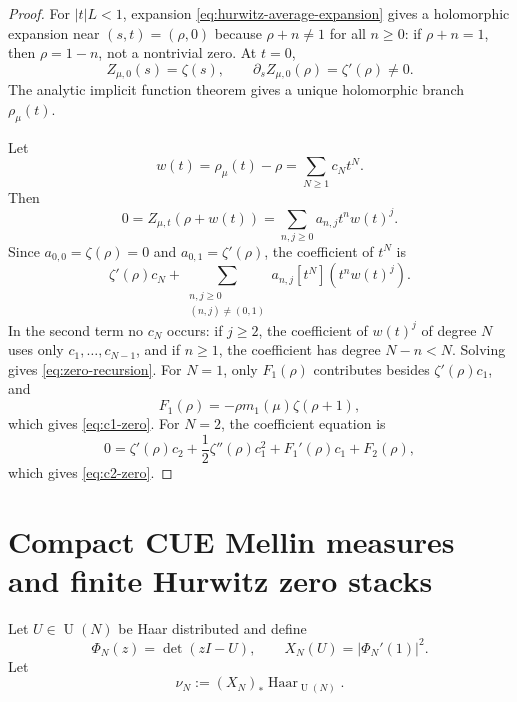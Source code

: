 \documentclass[11pt]{article}
\newcommand{\Haar}{\operatorname{Haar}}
\newcommand{\U}{\operatorname{U}}
\newcommand{\1}{\mathbf 1}
\numberwithin{equation}{section}
\begin{document}
\begin{proof}
For $|t|L<1$, expansion \eqref{eq:hurwitz-average-expansion} gives a holomorphic expansion near $(s,t)=(\rho,0)$ because $\rho+n\ne1$ for all $n\ge0$: if $\rho+n=1$, then $\rho=1-n$, not a nontrivial zero.  At $t=0$,
\begin{equation}
  Z_{\mu,0}(s)=\zeta(s),
  \qquad
  \partial_s Z_{\mu,0}(\rho)=\zeta'(\rho)\ne0.
\end{equation}
The analytic implicit function theorem gives a unique holomorphic branch $\rho_\mu(t)$.

Let
\begin{equation}
  w(t)=\rho_\mu(t)-\rho=\sum_{N\ge1}c_Nt^N.
\end{equation}
Then
\begin{equation}
  0=Z_{\mu,t}(\rho+w(t))=
  \sum_{n,j\ge0}a_{n,j}t^n w(t)^j.
\end{equation}
Since $a_{0,0}=\zeta(\rho)=0$ and $a_{0,1}=\zeta'(\rho)$, the coefficient of $t^N$ is
\begin{equation}
  \zeta'(\rho)c_N+
  \sum_{\substack{n,j\ge0\\(n,j)\ne(0,1)}}
  a_{n,j}[t^N](t^nw(t)^j).
\end{equation}
In the second term no $c_N$ occurs: if $j\ge2$, the coefficient of $w(t)^j$ of degree $N$ uses only $c_1,\dots,c_{N-1}$, and if $n\ge1$, the coefficient has degree $N-n<N$.  Solving gives \eqref{eq:zero-recursion}.  For $N=1$, only $F_1(\rho)$ contributes besides $\zeta'(\rho)c_1$, and
\begin{equation}
  F_1(\rho)=-\rho m_1(\mu)\zeta(\rho+1),
\end{equation}
which gives \eqref{eq:c1-zero}.  For $N=2$, the coefficient equation is
\begin{equation}
  0=\zeta'(\rho)c_2+\frac12\zeta''(\rho)c_1^2+F_1'(\rho)c_1+F_2(\rho),
\end{equation}
which gives \eqref{eq:c2-zero}.
\end{proof}

\section{Compact CUE Mellin measures and finite Hurwitz zero stacks}\label{sec:cue-stack}

Let $U\in\U(N)$ be Haar distributed and define
\begin{equation}
  \Phi_N(z)=\det(zI-U),
  \qquad
  X_N(U)=|\Phi_N'(1)|^2.
\end{equation}
Let
\begin{equation}
  \nu_N:=(X_N)_*\Haar_{\U(N)}.
\end{equation}
\end{document}
